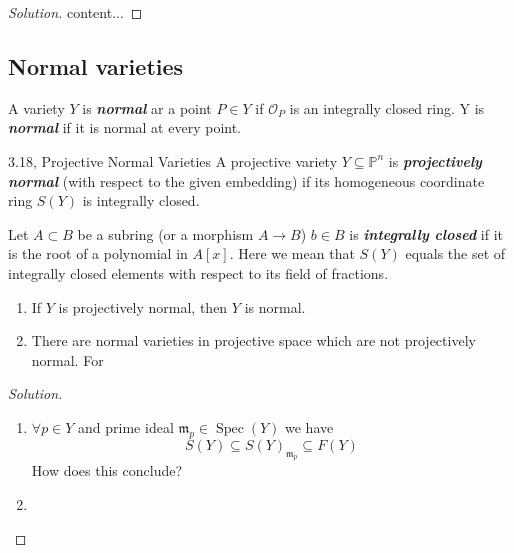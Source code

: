 \begin{proof}[Solution]
	content...
\end{proof}

\subsection{Normal varieties}

\begin{manualexercise}{3.17}
	A variety $Y$ is \textit{\textbf{normal}} ar a point $P\in Y$ if $\mathcal{O}_{P}$ is an integrally closed ring. Y is \textit{\textbf{normal}} if it is normal at every point.
\end{manualexercise}

\begin{manualexercise}{3.18, Projective Normal Varieties}
	A projective variety $Y\subseteq \mathbb{P}^n$ is \textit{\textbf{projectively normal}} (with respect to the given embedding) if its homogeneous coordinate ring $S(Y)$ is integrally closed.

	\begin{defn}
		Let $A\subset B$ be a subring (or a morphism $A\to B$) $b\in B$ is \textit{\textbf{integrally closed}} if it is the root of a polynomial in $A[x]$. Here we mean that  $S(Y)$ equals the set of integrally closed elements with respect to its field of fractions.
	\end{defn}

	\begin{enumerate}[label=\alph*.]
		\item If $Y$ is projectively normal, then $Y$ is normal.

		\item There are normal varieties in projective space which are not projectively normal. For
	\end{enumerate}
\end{manualexercise}

\begin{proof}[Solution]\leavevmode
	\begin{enumerate}[label=\alph*.]
		\item $\forall p \in Y$ and prime ideal $\mathfrak{m}_p  \in\operatorname{Spec}(Y)$ we have
			\[S(Y)\subseteq S(Y)_{\mathfrak{m}_p}\subseteq F(Y)\]
			{\color{magenta}How does this conclude?}

		\item 
	\end{enumerate}
\end{proof}

